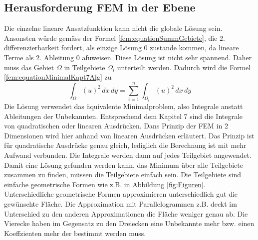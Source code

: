 \subsection{Herausforderung FEM in der Ebene}
Die einzelne lineare Ansatzfunktion kann nicht die globale Lösung sein. Ansonsten würde gemäss der Formel \eqref{fem:equationSummGebiete}, die 2. differenzierbarkeit fordert, als einzige Lösung 0 zustande kommen, da lineare Terme als 2. Ableitung 0 afuweisen. Diese Lösung ist nicht sehr spannend. Daher muss das Gebiet $\Omega$ in Teilgebiete $\Omega_i$ unterteilt werden. Dadurch wird die Formel \eqref{fem:equationMinimalKapt7Alg} zu
\begin{equation}
\int_{\Omega} (u)^2 \, dx \, dy = \sum \limits_{i=1}^n \int_{\Omega_i} (u)^2 \, dx \, dy 
\label{fem:equationSummGebiete}
\end{equation}
Die Lösung verwendet das äquivalente Minimalproblem, also Integrale anstatt Ableitungen der Unbekannten. Entsprechend dem Kapitel 7 sind die Integrale von quadratischen oder linearen Ausdrücken. Dans Prinzip der FEM in 2 Dimensionen wird hier anhand von linearen Ausdrücken erläutert. Das Prinzip ist für quadratische Ausdrücke genau gleich, lediglich die Berechnung ist mit mehr Aufwand verbunden. Die Integrale werden dann auf jedes Teilgebiet angewendet. Damit eine Lösung gefunden werden kann, das Minimum über alle Teilgebiete zusammen zu finden, müssen die Teilgebiete einfach sein. Die Teilgebiete sind einfache geometrische Formen wie z.B. in Abbildung \ref{fig:Figuren}. Unterschiedliche geometrische Formen approximieren unterschiedlich gut die gewünschte Fläche. Die Approximation mit Parallelogrammen z.B. deckt im Unterschied zu den anderen Approximationen die Fläche weniger genau ab. Die Vierecke haben im Gegensatz zu den Dreiecken eine Unbekannte mehr bzw. einen Koeffzienten mehr der bestimmt werden  muss.
